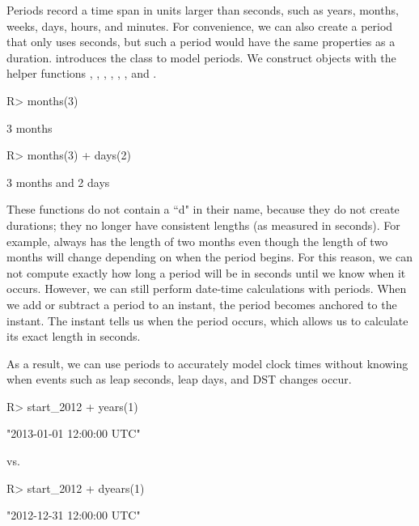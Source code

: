 \documentclass[article]{jss}
\begin{document}
Periods record a time span in units larger than seconds, such as years, months, weeks, days, hours, and minutes. For convenience, we can also create a period that only uses seconds, but such a period would have the same properties as a duration.  introduces the  class to model periods. We construct  objects with the helper functions , , , , , , and  .

\begin{CodeInput}
R> months(3)
\end{CodeInput}
\begin{CodeOutput}
[1] 3 months
\end{CodeOutput}

\begin{CodeInput}
R> months(3) + days(2)
\end{CodeInput}
\begin{CodeOutput}
[1] 3 months and 2 days
\end{CodeOutput}

These functions do not contain a ``d" in their name, because they do not create durations; they no longer have consistent lengths (as measured in seconds). For example,  always has the length of two months even though the length of two months will change depending on when the period begins. For this reason, we can not compute exactly how long a period will be in seconds until we know when it occurs. However, we can still perform date-time calculations with periods. When we add or subtract a period to an instant, the period becomes anchored to the instant. The instant tells us when the period occurs, which allows us to calculate its exact length in seconds. 

As a result, we can use periods to accurately model clock times without knowing when events such as leap seconds, leap days, and DST changes occur.

\begin{CodeInput}
R> start_2012 + years(1)
\end{CodeInput}
\begin{CodeOutput}
[1] "2013-01-01 12:00:00 UTC"
\end{CodeOutput}

vs.

\begin{CodeInput}
R> start_2012 + dyears(1)
\end{CodeInput}
\begin{CodeOutput}
[1] "2012-12-31 12:00:00 UTC"
\end{CodeOutput}
\end{document}
